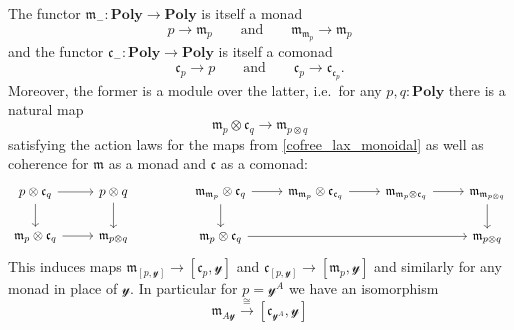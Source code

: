 \documentclass[11pt, one side, article]{memoir}
\theoremstyle{definition}
\theoremstyle{plain}
\newcommand{\Cat}[1]{\mathbf{#1}}%
\newcommand{\To}[2][]{\xrightarrow[#1]{#2}}
\newcommand{\yon}{\mathcal{y}}
\newcommand{\poly}{\Cat{Poly}}
\newcommand{\0}{\textsf{0}}
\newcommand{\1}{\tn{\textsf{1}}}
\newcommand{\cofree}{\mathfrak{c}}
\newcommand{\free}{\mathfrak{m}}
\newcommand{\qqand}{\qquad\text{and}\qquad}
\begin{document}
The functor $\free_-\colon\poly\to\poly$ is itself a monad
\begin{equation}
	p\to\free_p
	\qqand
	\free_{\free_p}\to\free_p
\end{equation}
and the functor $\cofree_-\colon\poly\to\poly$ is itself a comonad
\begin{equation}
	\cofree_p\to p
	\qqand
	\cofree_p\to\cofree_{\cofree_p}. 
\end{equation}
Moreover, the former is a module over the latter, i.e.\ for any $p,q:\poly$ there is a natural map
\begin{equation}\label{module_easy}
  \free_p\otimes\cofree_q\to\free_{p\otimes q}
\end{equation}
satisfying the action laws for the maps from \cref{cofree_lax_monoidal} as well as coherence for $\free$ as a monad and $\cofree$ as a comonad:
\begin{equation}\label{eqn.monad_comonad_coherence}
\begin{tikzcd}
  p\otimes\cofree_q\ar[r]\ar[d]&p\otimes q\ar[d]\\
  \free_p\otimes\cofree_q\ar[r]&\free_{p\otimes q}
\end{tikzcd}
\hspace{.6in}
\begin{tikzcd}
	\free_{\free_p}\otimes\cofree_q\ar[d]\ar[r]&
	\free_{\free_p}\otimes\cofree_{\cofree_q}\ar[r]&
	\free_{\free_p\otimes\cofree_q}\ar[r]&
	\free_{\free_{p\otimes q}}\ar[d]\\
	\free_p\otimes\cofree_q\ar[rrr]&&&
	\free_{p\otimes q}
\end{tikzcd}
\end{equation}
This induces maps $\free_{[p,\yon]}\to [\cofree_p,\yon]$ and $\cofree_{[p,\yon]}\to[\free_p,\yon]$ and similarly for any monad in place of $\yon$. In particular for $p=\yon^A$ we have an isomorphism
\begin{equation}
	\free_{A\yon}\To{\cong}[\cofree_{\yon^A},\yon]
\end{equation}

\end{document}
